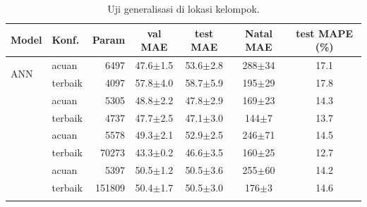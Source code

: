 \begin{table}[t]
\centering
\scriptsize
\caption{Uji generalisasi di lokasi kelompok.}
\label{tab:D}
\setlength{\tabcolsep}{2.5pt}
\begin{tabular}{@{}llrcccc@{}}
\toprule
Model & Konf. & Param & val MAE & test MAE & Natal MAE & test MAPE (\%) \\
\midrule
\multirow{2}{*}{ANN} & acuan & 6497 & 47.6$\pm$1.5 & 53.6$\pm$2.8 & 288$\pm$34 & 17.1 \\
 & terbaik & 4097 & 57.8$\pm$4.0 & 58.7$\pm$5.9 & 195$\pm$29 & 17.8 \\
\addlinespace[1pt]
\multirow{2}{*}{RNN} & acuan & 5305 & 48.8$\pm$2.2 & 47.8$\pm$2.9 & 169$\pm$23 & 14.3 \\
 & terbaik & 4737 & 47.7$\pm$2.5 & 47.1$\pm$3.0 & 144$\pm$7 & 13.7 \\
\addlinespace[1pt]
\multirow{2}{*}{LSTM} & acuan & 5578 & 49.3$\pm$2.1 & 52.9$\pm$2.5 & 246$\pm$71 & 14.5 \\
 & terbaik & 70273 & 43.3$\pm$0.2 & 46.6$\pm$3.5 & 160$\pm$25 & 12.7 \\
\addlinespace[1pt]
\multirow{2}{*}{GRU} & acuan & 5397 & 50.5$\pm$1.2 & 50.5$\pm$3.6 & 255$\pm$60 & 14.2 \\
 & terbaik & 151809 & 50.4$\pm$1.7 & 50.5$\pm$3.0 & 176$\pm$3 & 14.6 \\
\addlinespace[1pt]
\bottomrule
\end{tabular}
\end{table}